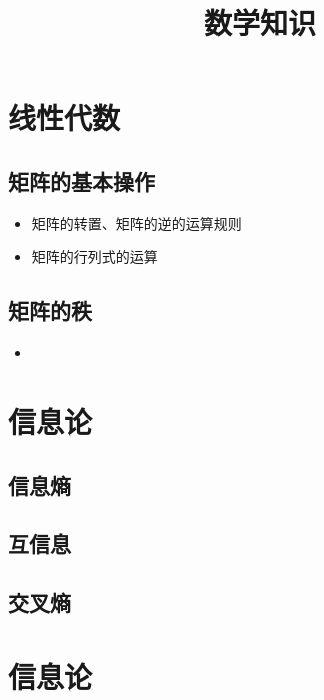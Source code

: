 \documentclass[12pt, letterpaper]{article}
\title{数学知识}
\begin{document}
\maketitle
\tableofcontents
\newpage

\section{线性代数}
\subsection{矩阵的基本操作}
\begin{itemize}
\item 矩阵的转置、矩阵的逆的运算规则
\item 矩阵的行列式的运算
\end{itemize}
\subsection{矩阵的秩}
\begin{itemize}
\item 
\end{itemize}


\section{信息论}
\subsection{信息熵}
\subsection{互信息}
\subsection{交叉熵}


\section{信息论}
\end{document}
